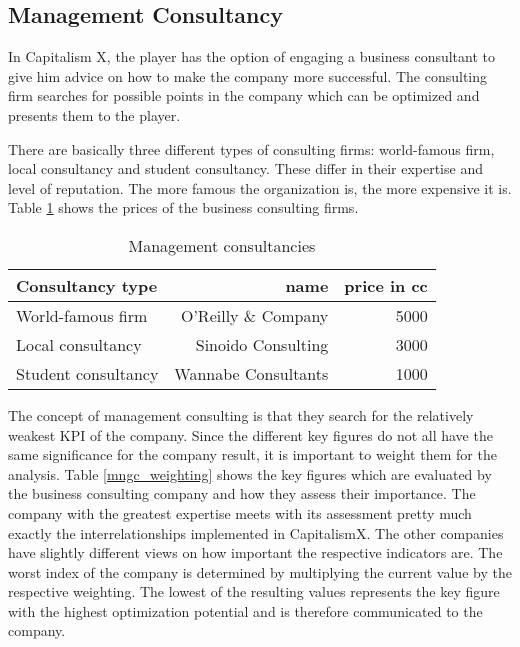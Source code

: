\subsection{Management Consultancy} \label{management_consultancy_simulation}
In Capitalism X, the player has the option of engaging a business consultant to give him advice on how to make the company more successful. 
The consulting firm searches for possible points in the company which can be optimized and presents them to the player.

There are basically three different types of consulting firms: world-famous firm, local consultancy and student consultancy. These differ in their expertise and level of reputation. The more famous the organization is, the more expensive it is. Table \ref{mng_consultancy} shows the prices of the business consulting firms. 

\begin{table}[ht]
\centering
\begin{tabular}{|l|r|r|}
\hline
\textbf{Consultancy type}   & \textbf{name}  & \textbf{price in cc} \\ \hline
World-famous firm       & O'Reilly \& Company     & 5000     \\
Local consultancy       & Sinoido Consulting     & 3000     \\
Student consultancy     & Wannabe Consultants    & 1000     \\
\hline
\end{tabular}
\caption{Management consultancies}
\label{mng_consultancy}
\end{table}

The concept of management consulting is that they search for the relatively weakest KPI of the company. Since the different key figures do not all have the same significance for the company result, it is important to weight them for the analysis.
Table \ref{mngc_weighting} shows the key figures which are evaluated by the business consulting company and how they assess their importance.
The company with the greatest expertise meets with its assessment pretty much exactly the interrelationships implemented in CapitalismX. The other companies have slightly different views on how important the respective indicators are. 
The worst index of the company is determined by multiplying the current value by the respective weighting. The lowest of the resulting values represents the key figure with the highest optimization potential and is therefore communicated to the company. 
 
